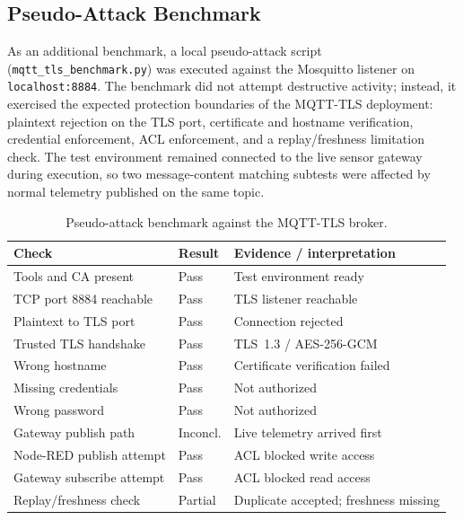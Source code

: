 \documentclass[conference]{IEEEtran}
\begin{document}
\subsection{Pseudo-Attack Benchmark}
As an additional benchmark, a local pseudo-attack script (\texttt{mqtt\_tls\_benchmark.py}) was executed against the Mosquitto listener on \texttt{localhost:8884}. The benchmark did not attempt destructive activity; instead, it exercised the expected protection boundaries of the MQTT-TLS deployment: plaintext rejection on the TLS port, certificate and hostname verification, credential enforcement, ACL enforcement, and a replay/freshness limitation check. The test environment remained connected to the live sensor gateway during execution, so two message-content matching subtests were affected by normal telemetry published on the same topic.

\begin{table}[t]
\centering
\caption{Pseudo-attack benchmark against the MQTT-TLS broker.}
\label{tab:tls_benchmark}
\scriptsize
\setlength{\tabcolsep}{2.5pt}
\renewcommand{\arraystretch}{0.92}
\begin{tabular}{@{}p{}p{}p{}@{}}
\toprule
Check & Result & Evidence / interpretation \\
\midrule
Tools and CA present & Pass & Test environment ready \\
TCP port 8884 reachable & Pass & TLS listener reachable \\
Plaintext to TLS port & Pass & Connection rejected \\
Trusted TLS handshake & Pass & TLS~1.3 / AES-256-GCM \\
Wrong hostname & Pass & Certificate verification failed \\
Missing credentials & Pass & Not authorized \\
Wrong password & Pass & Not authorized \\
Gateway publish path & Inconcl. & Live telemetry arrived first \\
Node-RED publish attempt & Pass & ACL blocked write access \\
Gateway subscribe attempt & Pass & ACL blocked read access \\
Replay/freshness check & Partial & Duplicate accepted; freshness missing \\
\bottomrule
\end{tabular}
\end{table}
\end{document}
